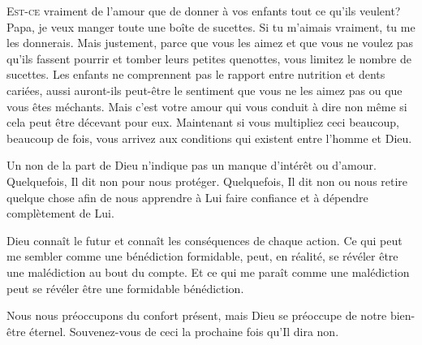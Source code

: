 
\lettrine{E}{st-ce} vraiment de l'amour que de donner à vos enfants
 tout ce qu'ils veulent?
 \Og Papa, je veux manger toute une boîte de sucettes.
 Si tu m'aimais vraiment, tu me les donnerais. \Fg{}
 Mais justement, parce que vous les aimez et que vous ne voulez pas
 qu'ils fassent pourrir et tomber leurs petites quenottes,
 vous limitez le nombre de sucettes.
 Les enfants ne comprennent pas le rapport entre nutrition et dents cariées,
 aussi auront-ils peut-être le sentiment que vous ne les aimez pas
 ou que vous êtes méchants. Mais c'est votre amour qui vous conduit à dire
 \Og non \Fg{} même si cela peut être décevant pour eux.
 Maintenant si vous multipliez ceci beaucoup, beaucoup de fois,
 vous arrivez aux conditions qui existent entre l'homme et Dieu. 


Un \Og non \Fg{} de la part de Dieu n'indique pas un 
 manque d'intérêt ou d'amour.
 Quelquefois, Il dit \Og non \Fg{} pour nous protéger.
 Quelquefois, Il dit \Og non \Fg{} ou nous retire quelque chose
 afin de nous apprendre à Lui faire confiance
 et à dépendre complètement de Lui. 

Dieu connaît le futur et connaît les conséquences de chaque action.
 Ce qui peut me sembler comme une bénédiction formidable, peut,
 en réalité, se révéler être une malédiction au bout du compte.
 Et ce qui me paraît comme une malédiction peut se révéler
 être une formidable bénédiction. 

Nous nous préoccupons du confort présent, mais Dieu se préoccupe
 de notre bien-être éternel.
 Souvenez-vous de ceci la prochaine fois qu'Il dira \Og non. \Fg{}

\dvrule





